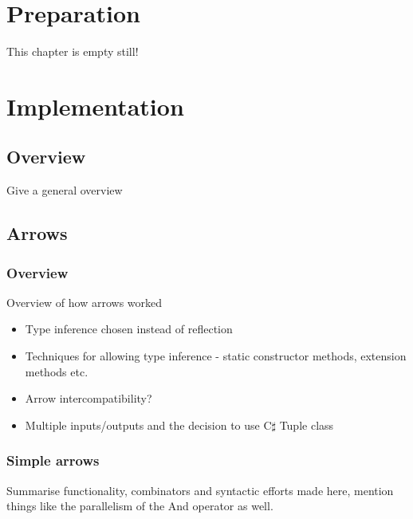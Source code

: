 \documentclass[12pt,twoside,notitlepage]{report}
\begin{document}

\chapter{Preparation}

This chapter is empty still!

\cleardoublepage



\chapter{Implementation}

\section{Overview}

Give a general overview


\section{Arrows}

\subsection{Overview}

Overview of how arrows worked

\begin{itemize}
	\item Type inference chosen instead of reflection
	\item Techniques for allowing type inference - static constructor methods, extension methods etc.
	\item Arrow intercompatibility?
	\item Multiple inputs/outputs and the decision to use C$\sharp$ Tuple class
\end{itemize}

\subsection{Simple arrows}

Summarise functionality, combinators and syntactic efforts made here, mention things like the parallelism of the And operator as well.
\end{document}
